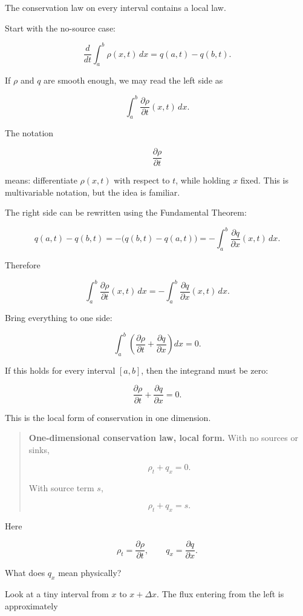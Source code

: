 The conservation law on every interval contains a local law.

Start with the no-source case:

\[
\frac{d}{dt}\int_a^b \rho(x,t)\,dx
=
q(a,t)-q(b,t).
\]

If \(\rho\) and \(q\) are smooth enough, we may read the left side as

\[
\int_a^b \frac{\partial \rho}{\partial t}(x,t)\,dx.
\]

The notation

\[
\frac{\partial \rho}{\partial t}
\]

means: differentiate \(\rho(x,t)\) with respect to \(t\), while holding \(x\) fixed.  This
is multivariable notation, but the idea is familiar.

The right side can be rewritten using the Fundamental Theorem:

\[
q(a,t)-q(b,t)
=
-\bigl(q(b,t)-q(a,t)\bigr)
=
-\int_a^b \frac{\partial q}{\partial x}(x,t)\,dx.
\]

Therefore

\[
\int_a^b \frac{\partial \rho}{\partial t}(x,t)\,dx
=
-\int_a^b \frac{\partial q}{\partial x}(x,t)\,dx.
\]

Bring everything to one side:

\[
\int_a^b
\left(
\frac{\partial \rho}{\partial t}
+
\frac{\partial q}{\partial x}
\right)
dx=0.
\]

If this holds for every interval \([a,b]\), then the integrand must be zero:

\[
\boxed{
\frac{\partial \rho}{\partial t}
+
\frac{\partial q}{\partial x}
=
0.
}
\]

This is the local form of conservation in one dimension.

\begin{quote}
\textbf{One-dimensional conservation law, local form.}
With no sources or sinks,

\[
\boxed{
\rho_t+q_x=0.
}
\]

With source term \(s\),

\[
\boxed{
\rho_t+q_x=s.
}
\]
\end{quote}

Here

\[
\rho_t=\frac{\partial \rho}{\partial t},
\qquad
q_x=\frac{\partial q}{\partial x}.
\]

What does \(q_x\) mean physically?

Look at a tiny interval from \(x\) to \(x+\Delta x\).  The flux entering from the left is
approximately

